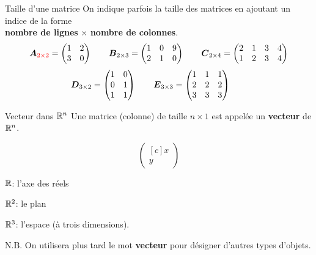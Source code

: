 \documentclass[french, handout]{beamer}
\begin{document}
	\begin{frame}{Taille d'une matrice}
	On indique parfois la taille des matrices en ajoutant un indice de la forme\\
	\textbf{nombre de lignes} $\times$ \textbf{nombre de colonnes}.
		\[
\boldsymbol{A}_{\color{red}2\times2} = \begin{pmatrix}
1 & 2 \\
3 & 0 
\end{pmatrix} \qquad 
\boldsymbol{B}_{2\times3} = \begin{pmatrix}
1 & 0 & 9 \\
2 & 1 & 0 
\end{pmatrix} \qquad
\boldsymbol{C}_{2\times4} = \begin{pmatrix}
2 & 1 & 3 & 4\\
1 & 2 & 3 & 4
\end{pmatrix} \]
\[
\boldsymbol{D}_{3\times2} = \begin{pmatrix}
1 & 0  \\
0 & 1  \\
1 & 1
\end{pmatrix} \qquad
\boldsymbol{E}_{3\times3} = \begin{pmatrix}
1 & 1 & 1 \\
2 & 2 & 2 \\
3 & 3 & 3
\end{pmatrix} \qquad
	\]
\end{frame}		
		
\begin{frame}{Vecteur dans $\mathbb{R}^n$}
Une matrice (colonne) de taille $n\times 1$ est appelée un \textbf{vecteur} de $\mathbb{R}^n$.

\[
\begin{pmatrix}[c] x\\y
\end{pmatrix}
\]

$\mathbb{R}$: l'axe des réels

$\mathbb{R}^2$: le plan

$\mathbb{R}^3$: l'espace (à trois dimensions).

\vfill
N.B. On utilisera plus tard le mot \textbf{vecteur} pour désigner d'autres types d'objets.

\end{frame}
	
\end{document}
